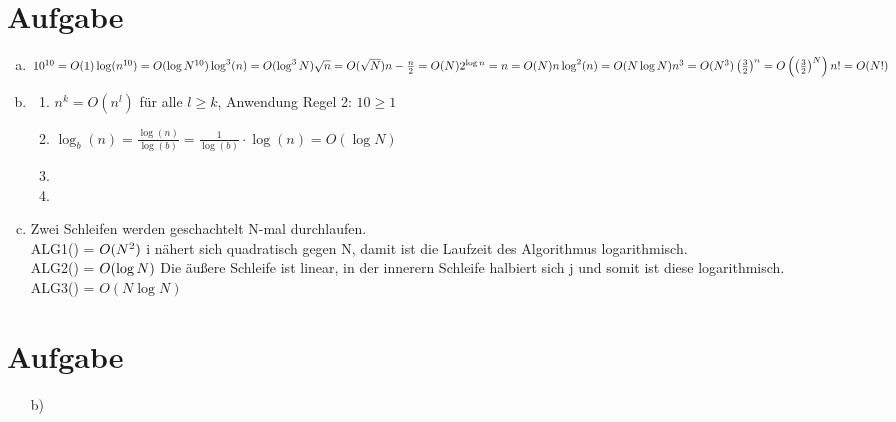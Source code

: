 \documentclass[a4paper]{scrartcl}
\begin{document}
\section{Aufgabe}
\begin{enumerate}[a)]
 \item $
 10^{10} = O(1) \\
 \log(n^{10}) = O(\log N^{10}) \\
 \log^3(n) = O(\log^3 N) \\
 \sqrt{n} = O(\sqrt{N}) \\
 n-\frac{n}{2} = O(N) \\
 2^{\log n} = n = O(N) \\
 n \log^2 (n) = O(N \log N) \\
 n^3 = O(N^3) \\
 \left(\frac{3}{2}\right)^n = O\left(\left(\frac{3}{2}\right)^N\right) \\
 n! = O(N!)
 $
 \item
 \begin{enumerate}[1.]
  \item 
  $n^k = O(n^l) $ für alle $ l\geq k$, Anwendung Regel 2: $ 10 \geq 1$
  \item
  $ \log_b(n) = \frac{\log(n)}{\log(b)} = \frac{1}{\log(b)} \cdot \log(n) = O(\log N)$
  \item
  \item
 \end{enumerate}
\item
Zwei Schleifen werden geschachtelt N-mal durchlaufen. \\
ALG1() = $O(N^2) \\$
i nähert sich quadratisch gegen N, damit ist die Laufzeit des Algorithmus logarithmisch. \\
ALG2() = $O(\log N) \\$
Die äußere Schleife ist linear, in der innerern Schleife halbiert sich j und somit ist diese logarithmisch. \\
ALG3() = $O(N\log N)$
\end{enumerate}
\section{Aufgabe}
\begin{enumerate}
 \item[b)]
 
\end{enumerate}
\end{document}
